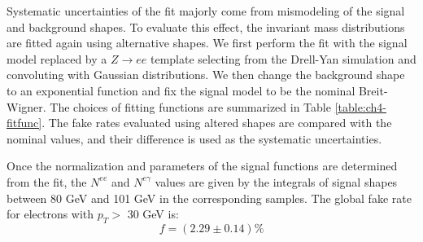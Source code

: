 \documentclass[thesis.tex]{subfiles}
\renewcommand\_{\textunderscore\allowbreak}
\begin{document}
Systematic uncertainties of the fit majorly come from mismodeling of the signal and background shapes. To evaluate this effect, the invariant mass distributions are fitted again using alternative shapes. We first perform the fit with the signal model replaced by a $Z\rightarrow ee$ template selecting from the Drell-Yan simulation and convoluting with Gaussian distributions. We then change the background shape to an exponential function and fix the signal model to be the nominal Breit-Wigner. The choices of fitting functions are summarized in Table \ref{table:ch4-fitfunc}.  The fake rates evaluated using altered shapes are compared with the nominal values, and their difference is used as the systematic uncertainties.

\begin{table}[hbt]
  \caption{Summary of the functions used to fit the tag-and-probe invariant mass. Nominal shapes in the table are used to determine the central values of the number of events in the numerator and denominator samples. Other functions are used for the measurement of systematic uncertainties.}
  \label{table:ch4-fitfunc}
\end{table}


Once the normalization and parameters of the signal functions are determined from the fit, the $N^{ee}$ and $N^{e\gamma}$ values are given by the integrals of signal shapes between 80 GeV and 101 GeV in the corresponding samples. The global fake rate for electrons with $p_T >$ 30 GeV is: 
\begin{equation}
        f = (2.29 \pm 0.14)\%
\end{equation}
\end{document}
